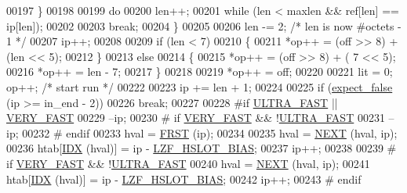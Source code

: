 \begin{DoxyCode}
00197                 \}
00198 
00199               \textcolor{keywordflow}{do}
00200                 len++;
00201               \textcolor{keywordflow}{while} (len < maxlen && ref[len] == ip[len]);
00202 
00203               \textcolor{keywordflow}{break};
00204             \}
00205 
00206           len -= 2; \textcolor{comment}{/* len is now #octets - 1 */}
00207           ip++;
00208 
00209           \textcolor{keywordflow}{if} (len < 7)
00210             \{
00211               *op++ = (off >> 8) + (len << 5);
00212             \}
00213           \textcolor{keywordflow}{else}
00214             \{
00215               *op++ = (off >> 8) + (  7 << 5);
00216               *op++ = len - 7;
00217             \}
00218 
00219           *op++ = off;
00220 
00221           lit = 0; op++; \textcolor{comment}{/* start run */}
00222 
00223           ip += len + 1;
00224 
00225           \textcolor{keywordflow}{if} (\hyperlink{lzf__c_8c_afc5fc140e1c36b6f0d3fc1699b038792}{expect\_false} (ip >= in\_end - 2))
00226             \textcolor{keywordflow}{break};
00227 
00228 \textcolor{preprocessor}{#}\textcolor{preprocessor}{if} \hyperlink{lzfP_8h_a35a67224caa202606b05b24f286bcb9e}{ULTRA\_FAST} \textcolor{preprocessor}{||} \hyperlink{lzfP_8h_a48a08aed5b9070297732293c1429ad88}{VERY\_FAST}
00229           --ip;
00230 \textcolor{preprocessor}{#} \textcolor{preprocessor}{if} \hyperlink{lzfP_8h_a48a08aed5b9070297732293c1429ad88}{VERY\_FAST} \textcolor{preprocessor}{&&} \textcolor{preprocessor}{!}\hyperlink{lzfP_8h_a35a67224caa202606b05b24f286bcb9e}{ULTRA\_FAST}
00231           --ip;
00232 \textcolor{preprocessor}{#} \textcolor{preprocessor}{endif}
00233           hval = \hyperlink{lzf__c_8c_a61be8c5e877134668e5eb72181722432}{FRST} (ip);
00234 
00235           hval = \hyperlink{lzf__c_8c_a7690f0d6b9709b87bb8bf162b6bd32e2}{NEXT} (hval, ip);
00236           htab[\hyperlink{lzf__c_8c_afbc4dc0e5192c430576d8e81647d0ae8}{IDX} (hval)] = ip - \hyperlink{lzfP_8h_a980629f2ad88980e35ca8519e53abac8}{LZF\_HSLOT\_BIAS};
00237           ip++;
00238 
00239 \textcolor{preprocessor}{#} \textcolor{preprocessor}{if} \hyperlink{lzfP_8h_a48a08aed5b9070297732293c1429ad88}{VERY\_FAST} \textcolor{preprocessor}{&&} \textcolor{preprocessor}{!}\hyperlink{lzfP_8h_a35a67224caa202606b05b24f286bcb9e}{ULTRA\_FAST}
00240           hval = \hyperlink{lzf__c_8c_a7690f0d6b9709b87bb8bf162b6bd32e2}{NEXT} (hval, ip);
00241           htab[\hyperlink{lzf__c_8c_afbc4dc0e5192c430576d8e81647d0ae8}{IDX} (hval)] = ip - \hyperlink{lzfP_8h_a980629f2ad88980e35ca8519e53abac8}{LZF\_HSLOT\_BIAS};
00242           ip++;
00243 \textcolor{preprocessor}{#} \textcolor{preprocessor}{endif}

\end{DoxyCode}
